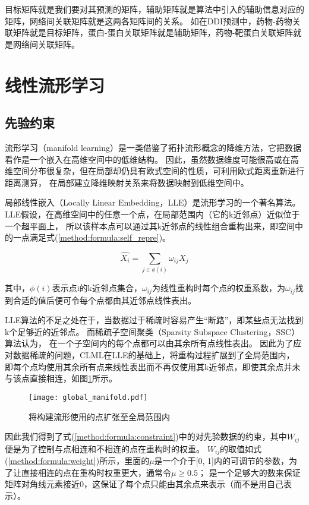 目标矩阵就是我们要对其预测的矩阵，辅助矩阵就是算法中引入的辅助信息对应的矩阵，网络间关联矩阵就是这两各矩阵间的关系。
如在DDI预测中，药物-药物关联矩阵就是目标矩阵，蛋白-蛋白关联矩阵就是辅助矩阵，药物-靶蛋白关联矩阵就是网络间关联矩阵。


\section{线性流形学习}
\subsection{先验约束}
\label{method:subsec:prior}
流形学习（manifold learning）是一类借鉴了拓扑流形概念的降维方法，它把数据看作是一个嵌入在高维空间中的低维结构。
因此，虽然数据维度可能很高或在高维空间分布很复杂，但在局部却仍具有欧式空间的性质，可利用欧式距离重新进行距离测算，
在局部建立降维映射关系来将数据映射到低维空间中。


局部线性嵌入（Locally Linear Embedding，LLE）是流形学习的一个著名算法。
LLE假设，在高维空间中的任意一个点，在局部范围内（它的k近邻点）近似位于一个超平面上，
所以该样本点可以通过其k近邻点的线性组合重构出来，即空间中的一点满足式(\ref{method:formula:self_repre})。


\begin{equation}
    \hat{X_i}=\sum_{j\in\phi(i)}\omega_{ij}X_j \label{method:formula:self_repre}
\end{equation}

其中，$\phi(i)$表示点i的k近邻点集合，$\omega_{ij}$为线性重构时每个点的权重系数，为$\omega_{ij}$找到合适的值后便可令每个点都由其近邻点线性表出。


LLE算法的不足之处在于，当数据过于稀疏时容易产生“断路”，即某些点无法找到k个足够近的近邻点。
而稀疏子空间聚类（Sparsity Subspace Clustering，SSC）算法认为，
在一个子空间内的每个点都可以由其余所有点线性表出\cite{elhamifar2013sparse}。
因此为了应对数据稀疏的问题，CLML在LLE的基础上，将重构过程扩展到了全局范围内，
即每个点均使用其余所有点来线性表出而不再仅使用其k近邻点，即使其余点并未与该点直接相连，如图\ref{method:fig:global_manifold}所示。

\begin{figure}
    \centering
    \texttt{[image: global\_manifold.pdf]}
    \caption{将构建流形使用的点扩张至全局范围内}
    \label{method:fig:global_manifold}
\end{figure}

因此我们得到了式(\ref{method:formula:constraint})中的对先验数据的约束，其中$W_{ij}$便是为了控制与点相连和不相连的点在重构时的权重。
$W_{ij}$的取值如式(\ref{method:formula:weight})所示，里面的$\mu$是一个介于[0, 1]内的可调节的参数，为了让直接相连的点在重构时权重更大，通常令$\mu\geq0.5$；
是一个足够大的数来保证矩阵对角线元素接近0，这保证了每个点只能由其余点来表示（而不是用自己表示）。

